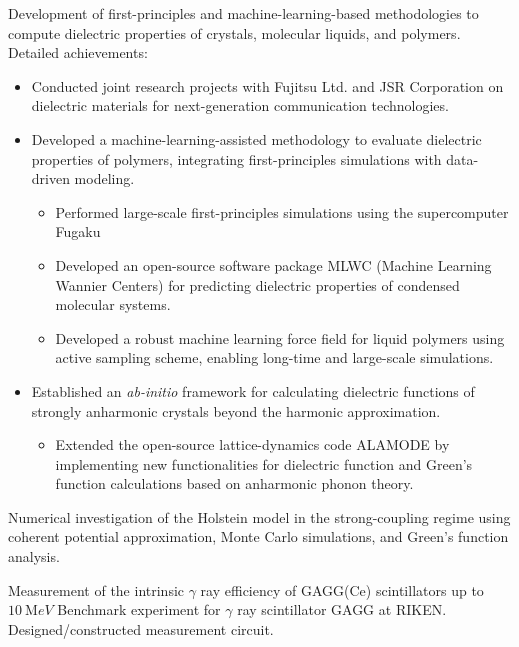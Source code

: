 \documentclass[11pt,a4paper,sans,colorlinks,lualatex,article]{moderncv}        %
\begin{document}
{Development of first-principles and machine-learning-based methodologies to compute dielectric properties of crystals, molecular liquids, and polymers.\newline{}
Detailed achievements:
\begin{itemize}
  \item Conducted joint research projects with Fujitsu Ltd. and JSR Corporation on dielectric materials for next-generation communication technologies.
  \item Developed a machine-learning-assisted methodology to evaluate dielectric properties of polymers, integrating first-principles simulations with data-driven modeling.
  \begin{itemize}
   \item Performed large-scale first-principles simulations using the supercomputer Fugaku
   \item Developed an open-source software package MLWC (Machine Learning Wannier Centers) for predicting dielectric properties of condensed molecular systems.
   \item Developed a robust machine learning force field for liquid polymers using active sampling scheme, enabling long-time and large-scale simulations.
  \end{itemize}
  \item Established an \textit{ab-initio} framework for calculating dielectric functions of strongly anharmonic crystals beyond the harmonic approximation.
  \begin{itemize}
  \item Extended the open-source lattice-dynamics code ALAMODE by implementing new functionalities for dielectric function and Green’s function calculations based on anharmonic phonon theory.
  \end{itemize}
\end{itemize}}

{Numerical investigation of the Holstein model in the strong-coupling regime using coherent potential approximation, Monte Carlo simulations, and Green’s function analysis.}

{Measurement of the intrinsic $\gamma$ ray efficiency of GAGG(Ce) scintillators up to $\SI[per-mode=symbol,per-symbol = p]{10}{\mega eV}$
Benchmark experiment for $\gamma$ ray scintillator GAGG at RIKEN. Designed/constructed measurement circuit.} 
\end{document}
